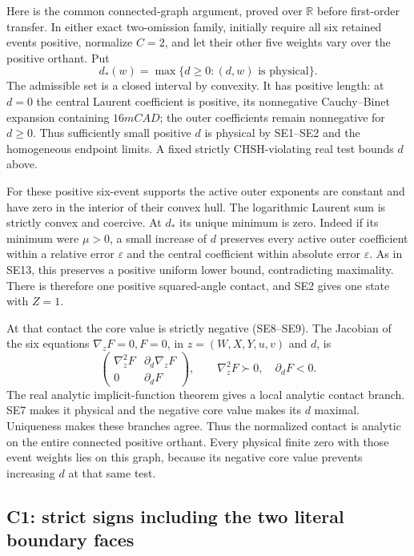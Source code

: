 Here is the common connected-graph argument, proved over \(\mathbb R\)
before first-order transfer.  In either exact two-omission family,
initially require all six retained events positive, normalize \(C=2\),
and let their other five weights vary over the positive orthant.  Put
\[
 d_*(w)=\max\{d\ge0:(d,w)\text{ is physical}\}.
 \tag{EN3}
\]
The admissible set is a closed interval by convexity.  It has positive
length: at \(d=0\) the central Laurent coefficient is positive, its
nonnegative Cauchy--Binet expansion containing \(16mCAD\); the outer
coefficients remain nonnegative for \(d\ge0\).  Thus sufficiently small
positive \(d\) is physical by SE1--SE2 and the homogeneous endpoint
limits.  A fixed strictly CHSH-violating real test bounds \(d\) above.

For these positive six-event supports the active outer exponents are
constant and have zero in the interior of their convex hull.  The
logarithmic Laurent sum is strictly convex and coercive.  At \(d_*\)
its unique minimum is zero.  Indeed if its minimum were \(\mu>0\),
a small increase of \(d\) preserves every active outer coefficient
within a relative error \(\varepsilon\) and the central coefficient
within absolute error \(\varepsilon\).  As in SE13, this preserves a
positive uniform lower bound, contradicting maximality.
There is therefore one positive squared-angle contact, and SE2 gives
one state with \(Z=1\).

At that contact the core value is strictly negative (SE8--SE9).
The Jacobian of the six equations
\(\nabla_zF=0,F=0\), in \(z=(W,X,Y,u,v)\) and \(d\), is
\[
 \begin{pmatrix}\nabla_z^2F&\partial_d\nabla_zF\\
 0&\partial_dF\end{pmatrix},
 \qquad \nabla_z^2F\succ0,\quad\partial_dF<0 .
 \tag{EN4}
\]
The real analytic implicit-function theorem gives a local analytic
contact branch.  SE7 makes it physical and the negative core value
makes its \(d\) maximal.  Uniqueness makes these branches agree.
Thus the normalized contact is analytic on the entire connected
positive orthant.  Every physical finite zero with those event weights
lies on this graph, because its negative core value prevents increasing
\(d\) at that same test.

\subsection{C1: strict signs including the two literal boundary faces}

